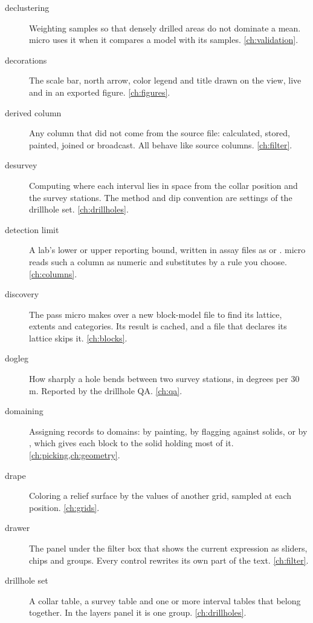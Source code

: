 \begin{description}
\item[declustering] Weighting samples so that densely drilled areas do not dominate a mean. micro
  uses it when it compares a model with its samples. \cref{ch:validation}.

\item[decorations] The scale bar, north arrow, color legend and title drawn on the view, live and
  in an exported figure. \cref{ch:figures}.

\item[derived column] Any column that did not come from the source file: calculated, stored,
  painted, joined or broadcast. All behave like source columns. \cref{ch:filter}.

\item[desurvey] Computing where each interval lies in space from the collar position and the survey
  stations. The method and dip convention are settings of the drillhole set. \cref{ch:drillholes}.

\item[detection limit] A lab's lower or upper reporting bound, written in assay files as
   or . micro reads such a column as numeric and substitutes by a rule you
  choose. \cref{ch:columns}.

\item[discovery] The pass micro makes over a new block-model file to find its lattice, extents and
  categories. Its result is cached, and a file that declares its lattice skips it.
  \cref{ch:blocks}.

\item[dogleg] How sharply a hole bends between two survey stations, in degrees per 30 m. Reported
  by the drillhole QA. \cref{ch:qa}.

\item[domaining] Assigning records to domains: by painting, by flagging against solids, or by
  , which gives each block to the solid holding most of it.
  \cref{ch:picking,ch:geometry}.

\item[drape] Coloring a relief surface by the values of another grid, sampled at each position.
  \cref{ch:grids}.

\item[drawer] The panel under the filter box that shows the current expression as sliders, chips
  and groups. Every control rewrites its own part of the text. \cref{ch:filter}.

\item[drillhole set] A collar table, a survey table and one or more interval tables that belong
  together. In the layers panel it is one group. \cref{ch:drillholes}.


\end{description}
